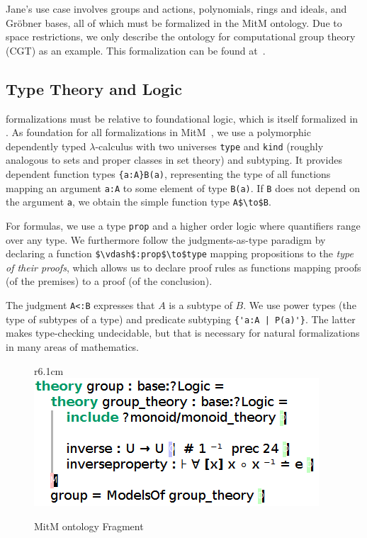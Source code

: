 Jane's use case involves groups and actions, polynomials, rings and ideals, and Gröbner bases, all of which must be formalized in the MitM ontology.
Due to space restrictions, we only describe the ontology for computational group theory (CGT) as an example.
This formalization can be found at~\cite{mitm:groups:on}.

\subsection{Type Theory and Logic}

\OMMT formalizations must be relative to foundational logic, which is itself formalized in \OMMT.
As foundation for all formalizations in MitM~\cite{mitm:foundation:on}, we use a polymorphic dependently typed $\lambda$-calculus with two universes \lstinline|type| and \lstinline|kind| (roughly analogous to sets and proper classes in set theory) and subtyping.
It provides dependent function types \lstinline|{a:A}B(a)|, representing the type of all functions mapping an argument \lstinline|a:A| to some element of type \lstinline|B(a)|. If \lstinline|B| does not depend on the argument \lstinline|a|, we obtain the simple function type \lstinline[mathescape]|A$\to$B|.

For formulas, we use a type \lstinline|prop| and a higher order logic where quantifiers range over any type.
We furthermore follow the judgments-as-type paradigm by declaring a function \lstinline[mathescape]|$\vdash$:prop$\to$type| mapping propositions to the \emph{type of their proofs}, which allows us to declare proof rules as functions mapping proofs (of the premises) to a proof (of the conclusion).

The judgment \lstinline|A<:B| expresses that $A$ is a subtype of $B$.
We use power types (the type of subtypes of a type) and predicate subtyping \lstinline?{'a:A | P(a)'}?.
The latter makes type-checking undecidable, but that is necessary for natural formalizations in many areas of mathematics.

\begin{figure}r{6.1cm}\vspace*{-2.5em}
  \includegraphics[width=.5\textwidth]{mitm1}\vspace*{-1em}
  \caption{MitM ontology Fragment}\label{fig:mitm1}\vspace*{-1em}
\end{figure}

